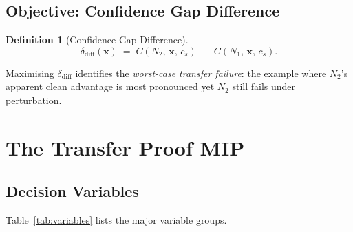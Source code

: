 \documentclass[11pt,a4paper]{article}
\theoremstyle{definition}
\newtheorem{definition}{Definition}[section]
\theoremstyle{plain}
\newcommand{\Conf}[3]{C(#1,\,#2,\,#3)}
\newcommand{\NN}[1]{N_{#1}}
\newcommand{\vx}{\mathbf{x}}
\newcommand{\deltadiff}{\delta_{\mathrm{diff}}}
\begin{document}
\subsection{Objective: Confidence Gap Difference}

\begin{definition}[Confidence Gap Difference]
\[
  \deltadiff(\vx) \;=\; \Conf{\NN{2}}{\vx}{c_s} \;-\; \Conf{\NN{1}}{\vx}{c_s}.
\]
\end{definition}

Maximising $\deltadiff$ identifies the \emph{worst-case transfer failure}: the example where $\NN{2}$'s apparent clean advantage is most pronounced yet $\NN{2}$ still fails under perturbation.

\section{The Transfer Proof MIP}
\label{sec:mip}

\subsection{Decision Variables}

Table~\ref{tab:variables} lists the major variable groups.
\end{document}
